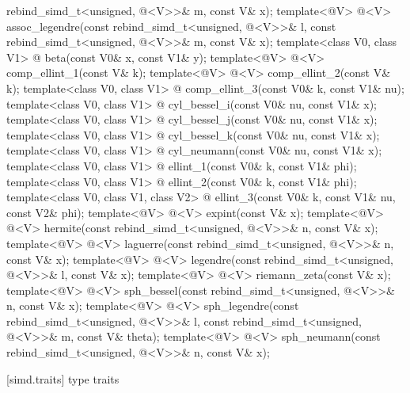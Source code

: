 \begin{codeblock}
{      rebind_simd_t<unsigned, @\deducedsimd@<V>>& m,
                     const V& x);
  template<@\mathfloatingpoint@ V>
    @\deducedsimd@<V> assoc_legendre(const rebind_simd_t<unsigned, @\deducedsimd@<V>>& l, const
      rebind_simd_t<unsigned, @\deducedsimd@<V>>& m,
                     const V& x);
  template<class V0, class V1>
    @ beta(const V0& x, const V1& y);
  template<@\mathfloatingpoint@ V> @\deducedsimd@<V> comp_ellint_1(const V& k);
  template<@\mathfloatingpoint@ V> @\deducedsimd@<V> comp_ellint_2(const V& k);
  template<class V0, class V1>
    @ comp_ellint_3(const V0& k, const V1& nu);
  template<class V0, class V1>
    @ cyl_bessel_i(const V0& nu, const V1& x);
  template<class V0, class V1>
    @ cyl_bessel_j(const V0& nu, const V1& x);
  template<class V0, class V1>
    @ cyl_bessel_k(const V0& nu, const V1& x);
  template<class V0, class V1>
    @ cyl_neumann(const V0& nu, const V1& x);
  template<class V0, class V1>
    @ ellint_1(const V0& k, const V1& phi);
  template<class V0, class V1>
    @ ellint_2(const V0& k, const V1& phi);
  template<class V0, class V1, class V2>
    @ ellint_3(const V0& k, const V1& nu, const V2& phi);
  template<@\mathfloatingpoint@ V> @\deducedsimd@<V> expint(const V& x);
  template<@\mathfloatingpoint@ V> @\deducedsimd@<V> hermite(const rebind_simd_t<unsigned,
  @\deducedsimd@<V>>& n, const V& x);
  template<@\mathfloatingpoint@ V> @\deducedsimd@<V> laguerre(const rebind_simd_t<unsigned,
  @\deducedsimd@<V>>& n, const V& x);
  template<@\mathfloatingpoint@ V> @\deducedsimd@<V> legendre(const rebind_simd_t<unsigned,
  @\deducedsimd@<V>>& l, const V& x);
  template<@\mathfloatingpoint@ V> @\deducedsimd@<V> riemann_zeta(const V& x);
  template<@\mathfloatingpoint@ V> @\deducedsimd@<V> sph_bessel(const rebind_simd_t<unsigned,
  @\deducedsimd@<V>>& n, const V& x);
  template<@\mathfloatingpoint@ V>
    @\deducedsimd@<V> sph_legendre(const rebind_simd_t<unsigned, @\deducedsimd@<V>>& l, const
      rebind_simd_t<unsigned, @\deducedsimd@<V>>& m,
                   const V& theta);
  template<@\mathfloatingpoint@ V> @\deducedsimd@<V> sph_neumann(const rebind_simd_t<unsigned,
  @\deducedsimd@<V>>& n, const V& x);
}
\end{codeblock}

[simd.traits]{ type traits}

